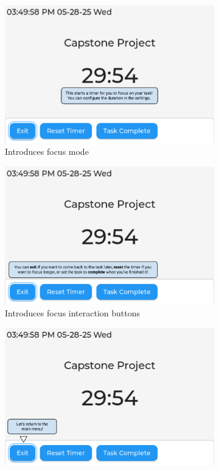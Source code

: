 \documentclass{article}
\begin{document}
\begin{figure}
    \ContinuedFloat
    \begin{subfigure}{0.5\textwidth}
        \includegraphics[width = \textwidth]{focus_tutorial.png}
        \caption{Introduces focus mode}
    \end{subfigure}
    \begin{subfigure}{0.5\textwidth}
        \includegraphics[width = \textwidth]{focus_buttons.png}
        \caption{Introduces focus interaction buttons}
    \end{subfigure}
    \begin{subfigure}{0.5\textwidth}
        \includegraphics[width = \textwidth]{Return.png}

\end{subfigure}
\end{figure}
\end{document}

